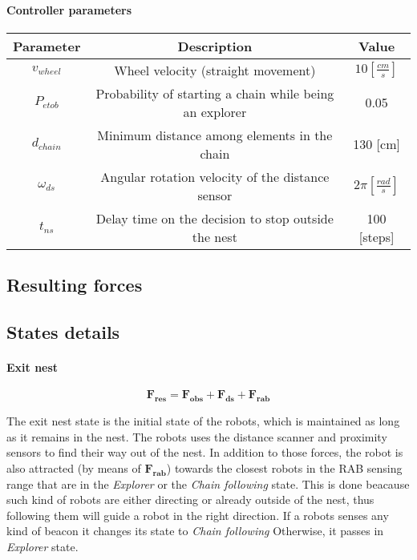 \paragraph{Controller parameters}
\begin{center}
\begin{tabular}{|c|c|c|}
\hline
\textbf{Parameter} & \textbf{Description} & \textbf{Value} \\ \hline
$v_{wheel}$ & Wheel velocity (straight movement) & $10 [\frac{cm}{s}]$ \\ \hline
$P_{etob}$ & Probability of starting a chain while being an explorer & 0.05 \\ \hline
$d_{chain}$ & Minimum distance among elements in the chain  & 130 [cm] \\ \hline
$\omega_{ds}$ & Angular rotation velocity of the distance sensor & $2\pi [\frac{rad}{s}]$ \\ \hline
$t_{ns}$ & Delay time on the decision to stop outside the nest & 100 [steps] \\ \hline
\end{tabular}
\label{tab:parameters}
\end{center}

\subsection{Resulting forces}

\subsection{States details}
\paragraph{Exit nest} \label{par:exitnest}
\begin{equation}
  \mathbf{F_{res}} = \mathbf{F_{obs}} + \mathbf{F_{ds}} + \mathbf{F_{rab}}
\end{equation}

The exit nest state is the initial state of the robots, which is maintained as long as it remains in the nest.
The robots uses the distance scanner and proximity sensors to find their way out 
of the nest.
In addition to those forces, the robot is also attracted (by means of $\mathbf{F_{rab}}$) 
towards the closest robots in the RAB sensing range that are in the \emph{Explorer} 
or the \emph{Chain following} state.
This is done beacause such kind of robots are either directing or already 
outside of the nest, thus following them will guide a robot in the right 
direction.
If a robots senses any kind of beacon it changes its state to \emph{Chain following}
Otherwise, it passes in \emph{Explorer} state.

